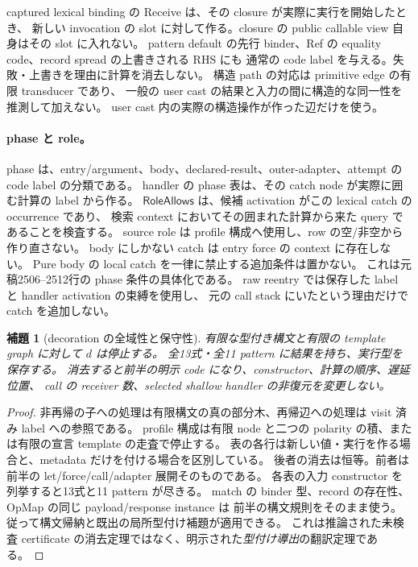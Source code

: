 \documentclass[11pt,a4paper]{article}
\newtheorem{lemma}[definition]{補題}
\begin{document}
captured lexical binding の Receive は、その closure が実際に実行を開始したとき、
新しい invocation の slot に対して作る。closure の public callable view 自身はその slot に入れない。
pattern default の先行 binder、Ref の equality code、record spread の上書きされる RHS にも
通常の code label を与える。失敗・上書きを理由に計算を消去しない。
構造 path の対応は primitive edge の有限 transducer であり、
一般の user cast の結果と入力の間に構造的な同一性を推測して加えない。
user cast 内の実際の構造操作が作った辺だけを使う。

\paragraph{phase と role。}
phase は、entry/argument、body、declared-result、outer-adapter、attempt の code label の分類である。
handler の phase 表は、その catch node が実際に囲む計算の label から作る。
\(\mathsf{RoleAllows}\) は、候補 activation がこの lexical catch の occurrence であり、
検索 context においてその囲まれた計算から来た query であることを検査する。
source role は profile 構成へ使用し、row の空/非空から作り直さない。
body にしかない catch は entry force の context に存在しない。
Pure body の local catch を一律に禁止する追加条件は置かない。
これは元稿2506--2512行の phase 条件の具体化である。
raw reentry では保存した label と handler activation の束縛を使用し、
元の call stack にいたという理由だけで catch を追加しない。

\begin{lemma}[decoration の全域性と保守性]
有限な型付き構文と有限の template graph に対して \(d\) は停止する。
全13式・全11 pattern に結果を持ち、実行型を保存する。
消去すると前半の明示 code になり、constructor、計算の順序、遅延位置、
call の receiver 数、selected shallow handler の非復元を変更しない。
\end{lemma}
\begin{proof}
非再帰の子への処理は有限構文の真の部分木、再帰辺への処理は visit 済み label への参照である。
profile 構成は有限 node と二つの polarity の積、または有限の宣言 template の走査で停止する。
表の各行は新しい値・実行を作る場合と、metadata だけを付ける場合を区別している。
後者の消去は恒等。前者は前半の let/force/call/adapter 展開そのものである。
各表の入力 constructor を列挙すると13式と11 pattern が尽きる。
match の binder 型、record の存在性、OpMap の同じ payload/response instance は
前半の構文規則をそのまま使う。従って構文帰納と既出の局所型付け補題が適用できる。
これは推論された未検査 certificate の消去定理ではなく、明示された\emph{型付け導出}の翻訳定理である。
\end{proof}
\end{document}
